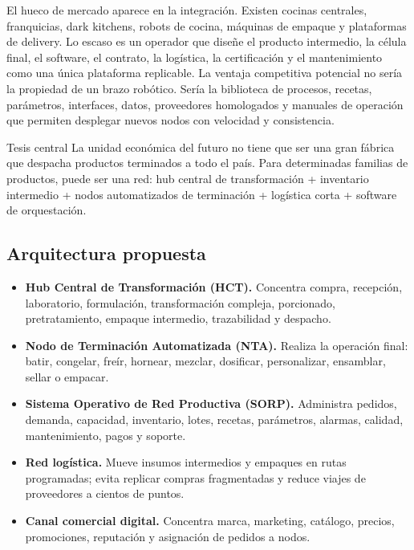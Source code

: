 \documentclass[11pt,a4paper]{article}
\begin{document}
El hueco de mercado aparece en la integración. Existen cocinas centrales, franquicias, dark kitchens,
robots de cocina, máquinas de empaque y plataformas de delivery. Lo escaso es un operador que diseñe el
producto intermedio, la célula final, el software, el contrato, la logística, la certificación y el
mantenimiento como una única plataforma replicable. La ventaja competitiva potencial no sería la
propiedad de un brazo robótico. Sería la biblioteca de procesos, recetas, parámetros, interfaces, datos,
proveedores homologados y manuales de operación que permiten desplegar nuevos nodos con velocidad y
consistencia.

\begin{caja}{Tesis central}
La unidad económica del futuro no tiene que ser una gran fábrica que despacha productos terminados a todo
el país. Para determinadas familias de productos, puede ser una red: hub central de transformación +
inventario intermedio + nodos automatizados de terminación + logística corta + software de orquestación.
\end{caja}

\subsection{Arquitectura propuesta}
\begin{itemize}
\item \textbf{Hub Central de Transformación (HCT).} Concentra compra, recepción, laboratorio, formulación,
transformación compleja, porcionado, pretratamiento, empaque intermedio, trazabilidad y despacho.
\item \textbf{Nodo de Terminación Automatizada (NTA).} Realiza la operación final: batir, congelar, freír,
hornear, mezclar, dosificar, personalizar, ensamblar, sellar o empacar.
\item \textbf{Sistema Operativo de Red Productiva (SORP).} Administra pedidos, demanda, capacidad,
inventario, lotes, recetas, parámetros, alarmas, calidad, mantenimiento, pagos y soporte.
\item \textbf{Red logística.} Mueve insumos intermedios y empaques en rutas programadas; evita replicar
compras fragmentadas y reduce viajes de proveedores a cientos de puntos.
\item \textbf{Canal comercial digital.} Concentra marca, marketing, catálogo, precios, promociones,
reputación y asignación de pedidos a nodos.
\end{itemize}
\end{document}
